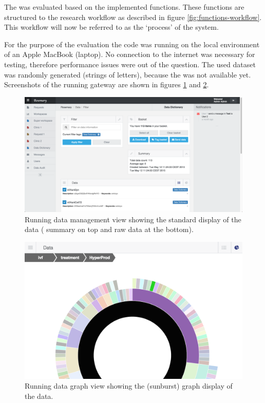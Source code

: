 The \ivfprototype{} was evaluated based on the implemented functions.
These functions are structured to the research workflow as described in figure \ref{fig:functions-workflow}. 
This workflow will now be referred to as the `process' of the system.

For the purpose of the evaluation the \ivfprototype{} code was running on the local environment of an Apple MacBook (laptop).
No connection to the internet was necessary for testing, therefore performance issues were out of the question.
The used dataset was randomly generated (strings of letters), because the \projectdata{} was not available yet.
Screenshots of the running gateway are shown in figures \ref{fig:standard-view-website} and \ref{fig:sunburst-view-zoom-website}.

\begin{figure}[!b]
	\centering
	\includegraphics[width=1.0\linewidth]{images/standard-view}
	\caption{
		Running \ivfsystem{} data management view showing the standard display of the data (\ie{} summary on top and raw data at the bottom).
	}
	\label{fig:standard-view-website}
\end{figure}

\begin{figure}[ht]
	\centering
	\includegraphics[width=0.7\linewidth]{images/sunburst-closeup}
	\caption{
		Running \ivfsystem{} data graph view showing the (sunburst) graph display of the data.
	}
	\label{fig:sunburst-view-zoom-website}
\end{figure}

